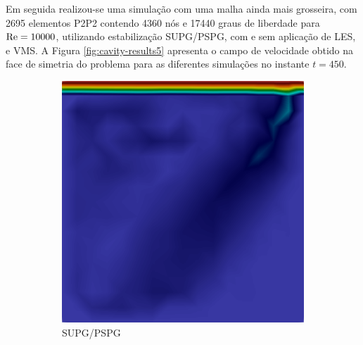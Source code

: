Em seguida realizou-se uma simulação com uma malha ainda mais grosseira, com 2695 elementos P2P2 contendo 4360 nós e 17440 graus de liberdade para $\mathrm{Re}=10000$, utilizando estabilização SUPG/PSPG, com e sem aplicação de LES, e VMS. A Figura \ref{fig:cavity-results5} apresenta o campo de velocidade obtido na face de simetria do problema para as diferentes simulações no instante $t=450$.

\begin{figure}[h!]
    \centering
    \caption{Cavidade tridimensional - Campo de velocidade na face de simetria.}
    \begin{subfigure}{0.32\textwidth}
        \centering
        \includegraphics[width=\linewidth]{Figuras/cavity3D/DNS.png}
        \caption{SUPG/PSPG}
    \end{subfigure}
    \begin{subfigure}{0.32\textwidth}
        \centering

\end{subfigure}
\end{figure}
